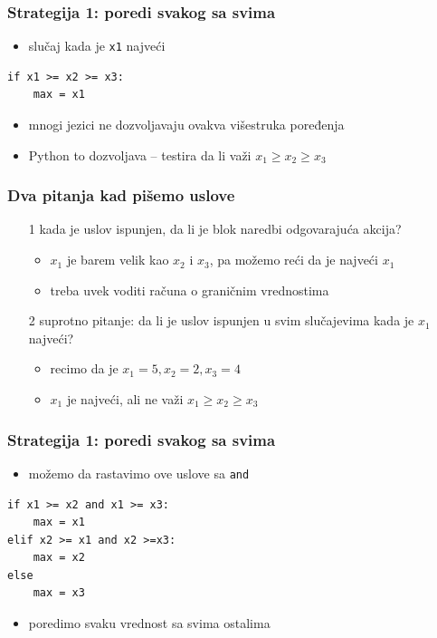 \documentclass[utf8,compress]{beamer}
\begin{document}
\begin{frame}[fragile]
  \frametitle{Strategija 1: poredi svakog sa svima}
  \begin{itemize}
    \item slučaj kada je \texttt{x1} najveći
  \end{itemize}
\begin{verbatim}
if x1 >= x2 >= x3:
    max = x1
\end{verbatim}
  \begin{itemize}
    \item mnogi jezici ne dozvoljavaju ovakva višestruka poređenja
    \item Python to dozvoljava -- testira da li važi $x_1 \geq x_2 \geq x_3$
  \end{itemize}
\end{frame}

\begin{frame}[fragile]
  \frametitle{Dva pitanja kad pišemo uslove}
  \begin{itemize}
    \item[1] kada je uslov ispunjen, da li je blok naredbi odgovarajuća akcija?
    \begin{itemize}
      \item $x_1$ je barem velik kao $x_2$ i $x_3$, pa možemo reći da je najveći $x_1$
      \item treba uvek voditi računa o graničnim vrednostima
    \end{itemize}
    \item[2] suprotno pitanje: da li je uslov ispunjen u svim slučajevima kada je $x_1$ najveći?
    \begin{itemize}
      \item recimo da je $x_1=5, x_2=2, x_3=4$
      \item $x_1$ je najveći, ali ne važi $x_1 \geq x_2 \geq x_3$
    \end{itemize}
  \end{itemize}
\end{frame}

\begin{frame}[fragile]
  \frametitle{Strategija 1: poredi svakog sa svima}
  \begin{itemize}
    \item možemo da rastavimo ove uslove sa \texttt{and}
  \end{itemize}
\begin{verbatim}
if x1 >= x2 and x1 >= x3:
    max = x1
elif x2 >= x1 and x2 >=x3:
    max = x2
else
    max = x3
\end{verbatim}
  \begin{itemize}
    \item poredimo svaku vrednost sa svima ostalima
  \end{itemize}
\end{frame}
\end{document}
